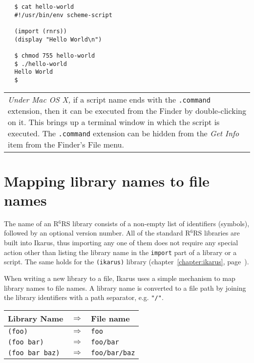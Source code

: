 \documentclass[onecolumn, 12pt, twoside, openright, dvipdfm]{book}
\newcommand{\rnrs}[1]{R$^{\mathrm{#1}}$RS}
\newcommand{\BoxedText}[2]{
  \vspace{.05in}
  \begin{center}
    \begin{tabular}{|p{4.6in}|} {\large \emph{#1}} #2 \end{tabular}
  \end{center}
  \vspace{.05in}
}
\begin{document}
\begin{verbatim}
   $ cat hello-world
   #!/usr/bin/env scheme-script
   
   (import (rnrs))
   (display "Hello World\n")
   
   $ chmod 755 hello-world
   $ ./hello-world
   Hello World
   $
\end{verbatim}

\BoxedText{Under Mac OS X,}{if a script name ends with the
\texttt{.command} extension, then it can be executed from the Finder
by double-clicking on it.  This brings up a terminal window in which
the script is executed.  The \texttt{.command} extension can be
hidden from the \emph{Get Info} item from the Finder's File menu.}

\newpage

\section{Mapping library names to file names}

The name of an \rnrs{6} library consists of a non-empty list of
identifiers (symbols), followed by an optional version number.  All
of the standard \rnrs{6} libraries are built into Ikarus, thus
importing any one of them does not require any special action other
than listing the library name in the \texttt{import} part of a
library or a script.  The same holds for the \texttt{(ikarus)}
library (chapter~\ref{chapter:ikarus},
page~\pageref{chapter:ikarus}).

When writing a new library to a file, Ikarus uses a simple mechanism
to map library names to file names.  A library name is converted to
a file path by joining the library identifiers with a path
separator, e.g. \verb|"/"|.

\begin{center}
\begin{tabular}{lcl}
  Library Name & \hspace{2em}$\Rightarrow$\hspace{2em} & File name \\
  \hline
  \verb|(foo)|         & $\Rightarrow$ & \verb|foo| \\
  \verb|(foo bar)|     & $\Rightarrow$ & \verb|foo/bar| \\
  \verb|(foo bar baz)| & $\Rightarrow$ & \verb|foo/bar/baz| 
\end{tabular}
\end{center}
\end{document}
